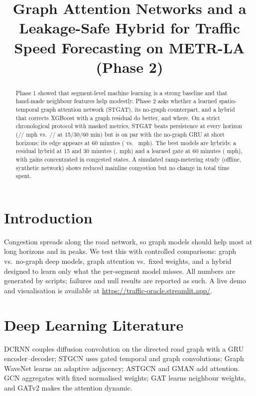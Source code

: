 \documentclass[conference]{IEEEtran}
\begin{document}
\title{Graph Attention Networks and a Leakage-Safe Hybrid for Traffic Speed Forecasting on METR-LA (Phase 2)}
\author{}
\maketitle

\begin{abstract}
Phase 1 showed that segment-level machine learning is a strong baseline and that hand-made neighbour features help modestly.
Phase 2 asks whether a learned spatio-temporal graph attention network (STGAT), its no-graph counterpart, and a hybrid that corrects XGBoost with a graph residual do better, and where.
On a strict chronological protocol with masked metrics, STGAT beats persistence at every horizon (\maeStgatFifteen{}/\maeStgatThirty{}/\maeStgatSixty{} mph vs.\ \maePersistenceFifteen{}/\maePersistenceThirty{}/\maePersistenceSixty{} at 15/30/60 min) but is on par with the no-graph GRU at short horizons; its edge appears at 60 minutes (\maeStgatSixty{} vs.\ \maeGruNographSixty{} mph).
The best models are hybrids: a residual hybrid at 15 and 30 minutes (\maeHybridResidualFifteen{}, \maeHybridResidualThirty{} mph) and a learned gate at 60 minutes (\maeHybridGatingSixty{} mph), with gains concentrated in congested states.
A simulated ramp-metering study (offline, synthetic network) shows reduced mainline congestion but no change in total time spent.
\end{abstract}

\section{Introduction}
Congestion spreads along the road network, so graph models should help most at long horizons and in peaks.
We test this with controlled comparisons: graph vs.\ no-graph deep models, graph attention vs.\ fixed weights, and a hybrid designed to learn only what the per-segment model misses.
All numbers are generated by scripts; failures and null results are reported as such. A live demo and visualisation is available at \url{https://traffic-oracle.streamlit.app/}.

\section{Deep Learning Literature}
DCRNN \cite{li2018dcrnn} couples diffusion convolution on the directed road graph with a GRU encoder--decoder; STGCN \cite{yu2018stgcn} uses gated temporal and graph convolutions; Graph WaveNet \cite{wu2019graphwavenet} learns an adaptive adjacency; ASTGCN \cite{guo2019astgcn} and GMAN \cite{zheng2020gman} add attention.
GCN \cite{kipf2017gcn} aggregates with fixed normalised weights; GAT \cite{velickovic2018gat} learns neighbour weights, and GATv2 \cite{brody2022gatv2} makes the attention dynamic.
\end{document}
